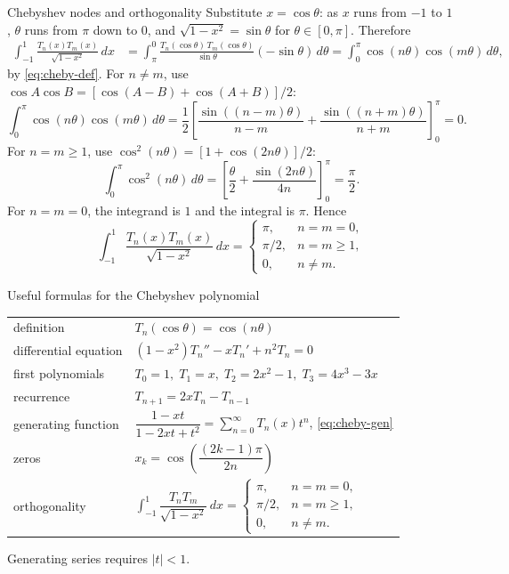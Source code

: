 \documentclass[11pt]{beamer}
\begin{document}
\begin{frame}[allowframebreaks=1.00]{Chebyshev nodes and orthogonality}
Substitute $x=\cos\theta$: as $x$ runs from $-1$ to $1$, $\theta$ runs from $\pi$ down to $0$,
and $\sqrt{1-x^2}=\sin\theta$ for $\theta\in[0,\pi]$.  Therefore
\begin{align*}
  \int_{-1}^{1}
    \frac{T_n(x)T_m(x)}{\sqrt{1-x^2}}\,dx
  &=\int_{\pi}^{0}
      \frac{T_n(\cos\theta)\,T_m(\cos\theta)}{\sin\theta}
      (-\sin\theta)\,d\theta
  =\int_0^{\pi}\cos(n\theta)\cos(m\theta)\,d\theta,
\end{align*}
by \eqref{eq:cheby-def}.  For $n\ne m$, use $\cos A\cos B=[\cos(A-B)+\cos(A+B)]/2$:
\[
 \int_0^\pi\cos(n\theta)\cos(m\theta)\,d\theta
 =\frac12\left[\frac{\sin((n-m)\theta)}{n-m}
              +\frac{\sin((n+m)\theta)}{n+m}\right]_0^\pi=0.
\]
For $n=m\ge1$, use $\cos^2(n\theta)=[1+\cos(2n\theta)]/2$:
\[
 \int_0^\pi\cos^2(n\theta)\,d\theta
 =\left[\frac\theta2+\frac{\sin(2n\theta)}{4n}\right]_0^\pi=\frac\pi2.
\]
For $n=m=0$, the integrand is $1$ and the integral is $\pi$.
Hence
\begin{equation}
  \int_{-1}^{1}
    \frac{T_n(x)T_m(x)}{\sqrt{1-x^2}}\,dx
  =
  \begin{cases}
    \pi, & n=m=0,\\[0.2em]
    \pi/2, & n=m\ge1,\\[0.2em]
    0, & n\ne m.
  \end{cases}
  \label{eq:cheby-ortho}
\end{equation}
\end{frame}

\begin{frame}{Useful formulas for the Chebyshev polynomial}
\footnotesize
\begin{center}
\renewcommand{\arraystretch}{1.55}
\begin{tabular}{ll}
definition
  & $T_n(\cos\theta)=\cos(n\theta)$ \\
differential equation
  & $(1-x^2)T_n''-xT_n'+n^2T_n=0$ \\
first polynomials
  & $T_0=1,\; T_1=x,\; T_2=2x^2-1,\; T_3=4x^3-3x$ \\
recurrence
  & $T_{n+1}=2xT_n-T_{n-1}$ \\
generating function
  & $\dfrac{1-xt}{1-2xt+t^2}
       =\displaystyle\sum_{n=0}^{\infty}T_n(x)t^n$, \;\eqref{eq:cheby-gen} \\
zeros
  & $x_k=\cos\left(\dfrac{(2k-1)\pi}{2n}\right)$ \\
orthogonality
  & $\displaystyle\int_{-1}^{1}
       \dfrac{T_nT_m}{\sqrt{1-x^2}}\,dx
       =\begin{cases}
          \pi, & n=m=0,\\
          \pi/2, & n=m\ge1,\\
          0, & n\ne m .
        \end{cases}$
\end{tabular}
\end{center}
{\scriptsize Generating series requires $|t|<1$.}
\end{frame}
\end{document}
